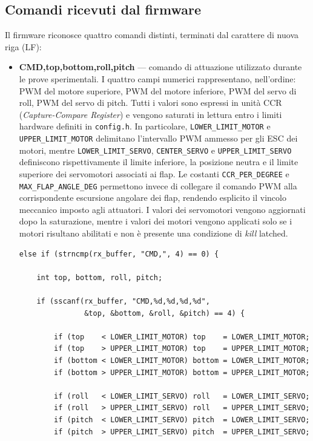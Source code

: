 \documentclass[11pt]{report}
\begin{document}
\subsection{Comandi ricevuti dal firmware}
Il firmware riconosce quattro comandi distinti, terminati dal carattere di nuova riga (LF):
\begin{itemize}
    \item \textbf{CMD,top,bottom,roll,pitch} — comando di attuazione utilizzato durante le prove sperimentali. I quattro campi numerici rappresentano, nell'ordine: PWM del motore superiore, PWM del motore inferiore, PWM del servo di roll, PWM del servo di pitch. Tutti i valori sono espressi in unità CCR (\textit{Capture-Compare Register}) e vengono saturati in lettura entro i limiti hardware definiti in \texttt{config.h}. In particolare, \texttt{LOWER\_LIMIT\_MOTOR} e \texttt{UPPER\_LIMIT\_MOTOR} delimitano l'intervallo PWM ammesso per gli ESC dei motori, mentre \texttt{LOWER\_LIMIT\_SERVO}, \texttt{CENTER\_SERVO} e \texttt{UPPER\_LIMIT\_SERVO} definiscono rispettivamente il limite inferiore, la posizione neutra e il limite superiore dei servomotori associati ai flap. Le costanti \texttt{CCR\_PER\_DEGREE} e \texttt{MAX\_FLAP\_ANGLE\_DEG} permettono invece di collegare il comando PWM alla corrispondente escursione angolare dei flap, rendendo esplicito il vincolo meccanico imposto agli attuatori. I valori dei servomotori vengono aggiornati dopo la saturazione, mentre i valori dei motori vengono applicati solo se i motori risultano abilitati e non è presente una condizione di \textit{kill} latched.

\begin{lstlisting}[caption={Parsing del comando CMD e saturazione dei valori PWM ricevuti da MATLAB.}, label={lst:nome}]
else if (strncmp(rx_buffer, "CMD,", 4) == 0) {

    int top, bottom, roll, pitch;

    if (sscanf(rx_buffer, "CMD,%d,%d,%d,%d",
               &top, &bottom, &roll, &pitch) == 4) {

        if (top    < LOWER_LIMIT_MOTOR) top    = LOWER_LIMIT_MOTOR;
        if (top    > UPPER_LIMIT_MOTOR) top    = UPPER_LIMIT_MOTOR;
        if (bottom < LOWER_LIMIT_MOTOR) bottom = LOWER_LIMIT_MOTOR;
        if (bottom > UPPER_LIMIT_MOTOR) bottom = UPPER_LIMIT_MOTOR;

        if (roll   < LOWER_LIMIT_SERVO) roll   = LOWER_LIMIT_SERVO;
        if (roll   > UPPER_LIMIT_SERVO) roll   = UPPER_LIMIT_SERVO;
        if (pitch  < LOWER_LIMIT_SERVO) pitch  = LOWER_LIMIT_SERVO;
        if (pitch  > UPPER_LIMIT_SERVO) pitch  = UPPER_LIMIT_SERVO;


\end{lstlisting}
\end{itemize}
\end{document}

